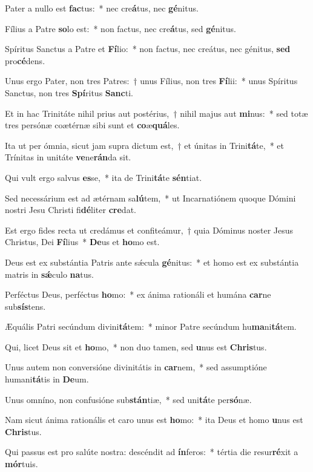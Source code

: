 \item Pater a nullo est \textbf{fac}tus:~* nec cre\textbf{á}tus, nec \textbf{gé}nitus.
\item Fílius a Patre \textbf{so}lo est:~* non factus, nec cre\textbf{á}tus, sed \textbf{gé}nitus.
\item Spíritus Sanctus a Patre et \textbf{Fí}lio:~* non factus, nec creátus, nec génitus, \textbf{sed} pro\textbf{cé}dens.
\item Unus ergo Pater, non tres Patres:~† unus Fílius, non tres \textbf{Fí}lii:~* unus Spíritus Sanctus, non tres \textbf{Spí}ritus \textbf{Sanc}ti.
\item Et in hac Trinitáte nihil prius aut postérius,~† nihil majus aut \textbf{mi}nus:~* sed totæ tres persónæ coætérnæ sibi sunt et \textbf{co}æ\textbf{quá}les.
\item Ita ut per ómnia, sicut jam supra dictum est,~† et únitas in Trini\textbf{tá}te,~* et Trínitas in unitáte \textbf{ve}ne\textbf{rán}da sit.
\item Qui vult ergo salvus \textbf{es}se,~* ita de Trini\textbf{tá}te \textbf{sén}tiat.
\item Sed necessárium est ad ætérnam sa\textbf{lú}tem,~* ut Incarnatiónem quoque Dómini nostri Jesu Christi fi\textbf{dé}liter \textbf{cre}dat.
\item Est ergo fides recta ut credámus et confiteámur,~† quia Dóminus noster Jesus Christus, Dei \textbf{Fí}lius~* \textbf{De}us et \textbf{ho}mo est.
\item Deus est ex substántia Patris ante sǽcula \textbf{gé}nitus:~* et homo est ex substántia matris in \textbf{sǽ}culo \textbf{na}tus.
\item Perféctus Deus, perféctus \textbf{ho}mo:~* ex ánima rationáli et humána \textbf{car}ne sub\textbf{sís}tens.
\item Æquális Patri secúndum divini\textbf{tá}tem:~* minor Patre secúndum hu\textbf{ma}ni\textbf{tá}tem.
\item Qui, licet Deus sit et \textbf{ho}mo,~* non duo tamen, sed \textbf{u}nus est \textbf{Chris}tus.
\item Unus autem non conversióne divinitátis in \textbf{car}nem,~* sed assumptióne humani\textbf{tá}tis in \textbf{De}um.
\item Unus omníno, non confusióne sub\textbf{stán}tiæ,~* sed uni\textbf{tá}te per\textbf{só}næ.
\item Nam sicut ánima rationális et caro unus est \textbf{ho}mo:~* ita Deus et homo \textbf{u}nus est \textbf{Chris}tus.
\item Qui passus est pro salúte nostra: descéndit ad \textbf{ín}feros:~* tértia die resur\textbf{ré}xit a \textbf{mór}tuis.
